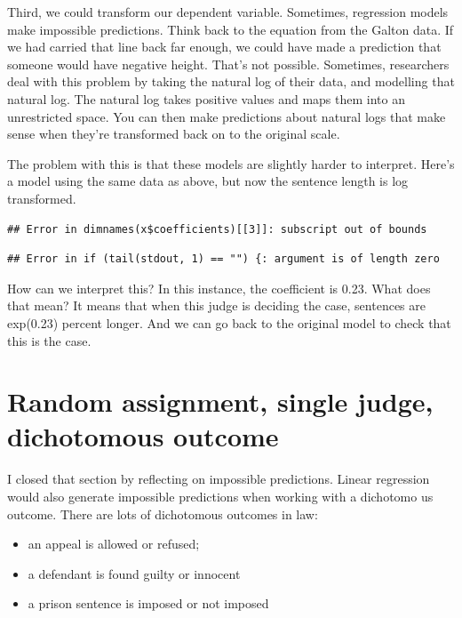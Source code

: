 \documentclass[12pt,twoside]{article}
\providecommand{\tightlist}{%
  \setlength{\itemsep}{0pt}\setlength{\parskip}{0pt}}
\begin{document}
Third, we could transform our dependent variable. Sometimes, regression
models make impossible predictions. Think back to the equation from the
Galton data. If we had carried that line back far enough, we could have
made a prediction that someone would have negative height. That's not
possible. Sometimes, researchers deal with this problem by taking the
natural log of their data, and modelling that natural log. The natural
log takes positive values and maps them into an unrestricted space. You
can then make predictions about natural logs that make sense when
they're transformed back on to the original scale.

The problem with this is that these models are slightly harder to
interpret. Here's a model using the same data as above, but now the
sentence length is log transformed.

\begin{verbatim}
## Error in dimnames(x$coefficients)[[3]]: subscript out of bounds
\end{verbatim}

\begin{verbatim}
## Error in if (tail(stdout, 1) == "") {: argument is of length zero
\end{verbatim}

How can we interpret this? In this instance, the coefficient is 0.23.
What does that mean? It means that when this judge is deciding the case,
sentences are exp(0.23) percent longer. And we can go back to the
original model to check that this is the case.

\section{Random assignment, single judge, dichotomous
outcome}\label{random-assignment-single-judge-dichotomous-outcome}

I closed that section by reflecting on impossible predictions. Linear
regression would also generate impossible predictions when working with
a dichotomo us outcome. There are lots of dichotomous outcomes in law:

\begin{itemize}
\tightlist
\item
  an appeal is allowed or refused;
\item
  a defendant is found guilty or innocent
\item
  a prison sentence is imposed or not imposed
\end{itemize}
\end{document}
